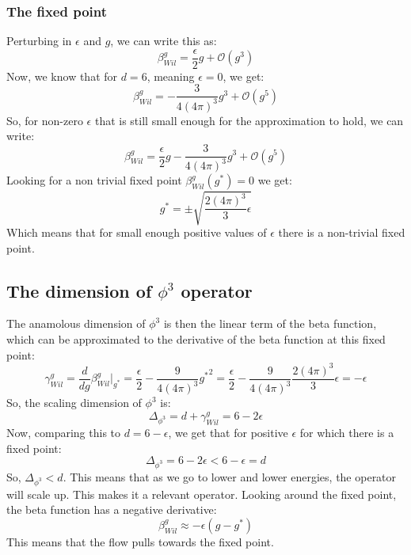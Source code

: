 \documentclass{article}
\begin{document}
\subsubsection{The fixed point}
Perturbing in $\epsilon$ and $g$, we can write this as:
\begin{equation}
    \beta_{Wil}^g = \frac{\epsilon}{2} g + \mathcal{O}(g^3)
\end{equation}
Now, we know that for $d = 6$, meaning $\epsilon = 0$, we get:
\begin{equation}
    \beta_{Wil}^g = -\frac{3}{4(4\pi)^3} g^3 + \mathcal{O}(g^5)
\end{equation}
So, for non-zero $\epsilon$ that is still small enough for the approximation to hold, we can write:
\begin{equation}
    \beta_{Wil}^g = \frac{\epsilon}{2} g -\frac{3}{4(4\pi)^3} g^3 + \mathcal{O}(g^5)
\end{equation}
Looking for a non trivial fixed point $\beta_{Wil}^g(g^*) = 0$ we get:
\begin{equation}
    g^* = \pm\sqrt{\frac{2(4\pi)^3}{3}\epsilon}
\end{equation}
Which means that for small enough positive values of $\epsilon$ there is a non-trivial fixed point.

\subsection{The dimension of $\phi^3$ operator}
The anamolous dimension of $\phi^3$ is then the linear term of the beta function, which can be approximated to the derivative of the beta function at this fixed point:
\begin{equation}
    \gamma_{Wil}^{g} = \frac{d}{dg}\beta_{Wil}^{g}\Big|_{g^*} = \frac{\epsilon}{2} - \frac{9}{4(4\pi)^3} {g^*}^2  = \frac{\epsilon}{2} - \frac{9}{4(4\pi)^3} \frac{2(4\pi)^3}{3}\epsilon = -\epsilon
\end{equation}
So, the scaling dimension of $\phi^3$ is:
\begin{equation}
    \Delta_{\phi^3} = d + \gamma_{Wil}^{g} = 6 - 2\epsilon
\end{equation}
Now, comparing this to $d = 6 - \epsilon$, we get that for positive $\epsilon$ for which there is a fixed point:
\begin{equation}
    \Delta_{\phi^3} = 6 - 2\epsilon < 6 - \epsilon = d
\end{equation}
So, $\Delta_{\phi^3} < d$. This means that as we go to lower and lower energies, the operator will scale up. This makes it a relevant operator.
\newline
Looking around the fixed point, the beta function has a negative derivative:
\begin{equation}
    \beta_{Wil}^g \approx -\epsilon (g - g^*)
\end{equation}
This means that the flow pulls towards the fixed point.
\end{document}
